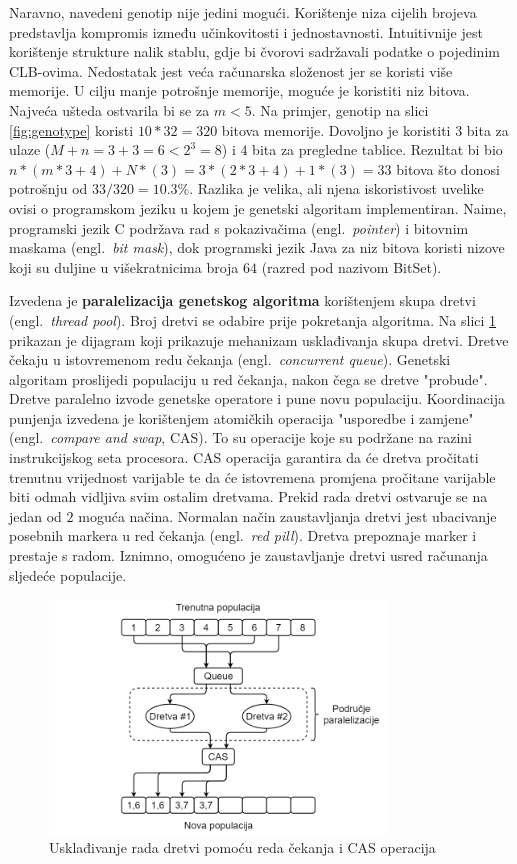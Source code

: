 \documentclass[times, utf8, diplomski]{fer}
\begin{document}
Naravno, navedeni genotip nije jedini mogući. Korištenje niza cijelih brojeva predstavlja kompromis između učinkovitosti i jednostavnosti. Intuitivnije jest korištenje strukture nalik stablu, gdje bi čvorovi sadržavali podatke o pojedinim CLB-ovima. Nedostatak jest veća računarska složenost jer se koristi više memorije. U cilju manje potrošnje memorije, moguće je koristiti niz bitova. Najveća ušteda ostvarila bi se za $m<5$. Na primjer, genotip na slici \ref{fig:genotype} koristi $10*32=320$ bitova memorije. Dovoljno je koristiti $3$ bita za ulaze ($M+n=3+3=6<2^{3}=8$) i $4$ bita za pregledne tablice. Rezultat bi bio $n*(m*3+4)+N*(3)=3*(2*3+4)+1*(3)=33$ bitova što donosi potrošnju od $33/320=10.3\%$. Razlika je velika, ali njena iskoristivost uvelike ovisi o programskom jeziku u kojem je genetski algoritam implementiran. Naime, programski jezik C podržava rad s pokazivačima (engl.~\textit{pointer}) i bitovnim maskama (engl.~\textit{bit mask}), dok programski jezik Java za niz bitova koristi nizove koji su duljine u višekratnicima broja $64$ (razred pod nazivom BitSet).

Izvedena je \textbf{paralelizacija genetskog algoritma} korištenjem skupa dretvi (engl.~\textit{thread pool}). Broj dretvi se odabire prije pokretanja algoritma. Na slici \ref{fig:threads} prikazan je dijagram koji prikazuje mehanizam usklađivanja skupa dretvi. Dretve čekaju u istovremenom redu čekanja (engl.~\textit{concurrent queue}). Genetski algoritam proslijedi populaciju u red čekanja, nakon čega se dretve "probude". Dretve paralelno izvode genetske operatore i pune novu populaciju. Koordinacija punjenja izvedena je korištenjem atomičkih operacija "usporedbe i zamjene" (engl.~\textit{compare and swap}, CAS). To su operacije koje su podržane na razini instrukcijskog seta procesora. CAS operacija garantira da će dretva pročitati trenutnu vrijednost varijable te da će istovremena promjena pročitane varijable biti odmah vidljiva svim ostalim dretvama. Prekid rada dretvi ostvaruje se na jedan od $2$ moguća načina. Normalan način zaustavljanja dretvi jest ubacivanje posebnih markera u red čekanja (engl.~\textit{red pill}). Dretva prepoznaje marker i prestaje s radom. Iznimno, omogućeno je zaustavljanje dretvi usred računanja sljedeće populacije.

\begin{figure}[htb]
	\centering
	\includegraphics[width=0.8\textwidth]{img/threads.png}
	\caption{Usklađivanje rada dretvi pomoću reda čekanja i CAS operacija}
	\label{fig:threads}
\end{figure}
\end{document}
